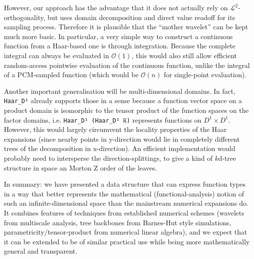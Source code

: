 \documentclass[sigplan,screen]{acmart}
\theoremstyle{acmplain}
\theoremstyle{acmdefinition}
\begin{document}
However, our approach has the advantage that it does not actually rely on $\mathcal{L}^2$-orthogonality, but uses domain decomposition and direct value readoff for its sampling process. Therefore it is plausible that the “mother wavelet” can be kept much more basic.
In particular, a very simple way to construct a continuous function from a Haar-based one is through integration. Because the complete integral can always be evaluated in $\mathcal{O}(1)$, this would also still allow efficient random-access pointwise evaluation of the continuous function, unlike the integral of a PCM-sampled function (which would be $\mathcal{O}(n)$ for single-point evaluation).

Another important generalisation will be mul\-ti-di\-men\-sio\-nal domains. In fact, \lstinline`Haar_D¹` already supports those in a sense because a function vector space on a product domain is isomorphic to the tensor product of the function spaces on the factor domains, i.e. \lstinline`Haar_D¹ (Haar_D¹ ℝ)` represents functions on $D^1\times D^1$. 
However, this would largely circumvent the locality properties of the Haar expansions (since nearby points in y-direction would lie in completely different trees of the decomposition in x-direction). An efficient implementation would probably need to intersperse the di\-rec\-tion-split\-tings, to give a kind of $k\mathrm{d}$-tree structure in space an Morton Z order of the leaves.

In summary: we have presented a data structure that can express function types in a way that better represents the mathematical (functional-analysis) notion of such an infinite-dimensional space than the mainstream numerical expansions do.
It combines features of techniques from established numerical schemes (wavelets from multiscale analysis, tree backbones from Barnes-Hut style simulations, pa\-ra\-met\-ri\-ci\-ty/ten\-sor-pro\-duct from numerical linear algebra), and we expect that it can be extended to be of similar practical use while being more mathematically general and transparent.


%
\end{document}
